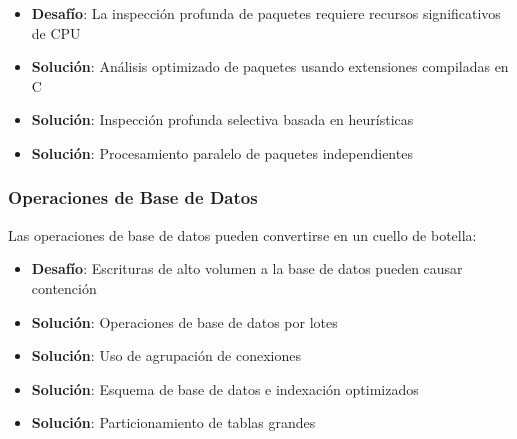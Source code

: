 \begin{itemize}
    \item \textbf{Desafío}: La inspección profunda de paquetes requiere recursos significativos de CPU
    \item \textbf{Solución}: Análisis optimizado de paquetes usando extensiones compiladas en C
    \item \textbf{Solución}: Inspección profunda selectiva basada en heurísticas
    \item \textbf{Solución}: Procesamiento paralelo de paquetes independientes
\end{itemize}

\subsubsection{Operaciones de Base de Datos}
Las operaciones de base de datos pueden convertirse en un cuello de botella:

\begin{itemize}
    \item \textbf{Desafío}: Escrituras de alto volumen a la base de datos pueden causar contención
    \item \textbf{Solución}: Operaciones de base de datos por lotes
    \item \textbf{Solución}: Uso de agrupación de conexiones
    \item \textbf{Solución}: Esquema de base de datos e indexación optimizados
    \item \textbf{Solución}: Particionamiento de tablas grandes
\end{itemize}


